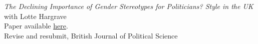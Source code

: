 \documentclass[centered]{res}
\begin{document}
\begin{resume}
{\sl The Declining Importance of Gender Stereotypes for Politicians? Style in the UK} \\
with Lotte Hargrave\\
Paper available \href{https://www.jackblumenau.com/papers/gender_styles.pdf} {here}.\\
Revise and resubmit, British Journal of Political Science









\end{resume}
\end{document}
